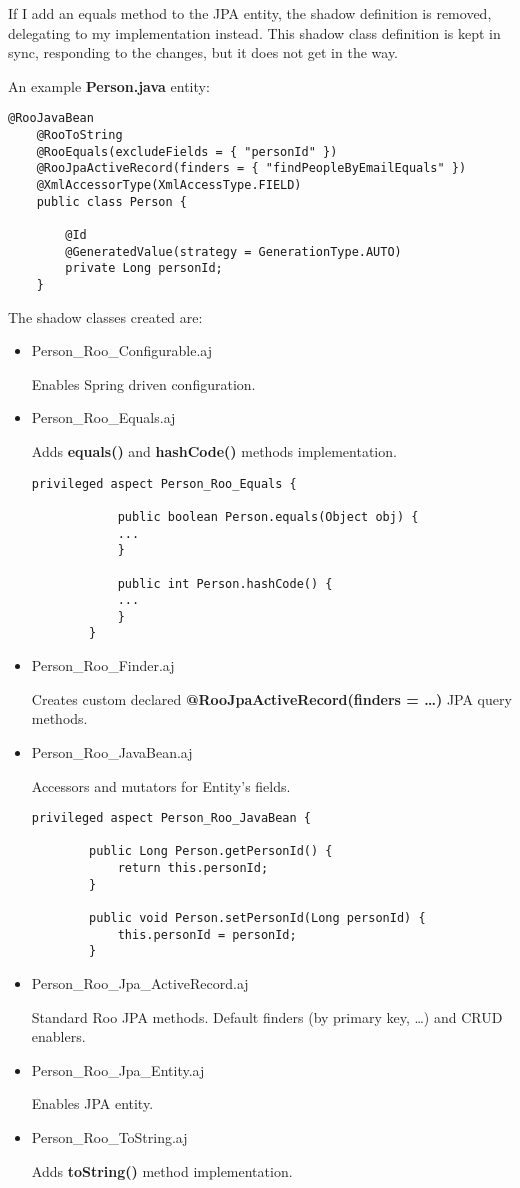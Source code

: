 	If I add an equals method to the JPA entity, the shadow definition is removed, delegating to my implementation instead.
	This shadow class definition is kept in sync, responding to the changes, but it does not get in the way.
	
	An example \textbf{Person.java} entity:
	
	\lstset{language=Java}
	\begin{lstlisting}[tabsize=2]
	@RooJavaBean
	@RooToString
	@RooEquals(excludeFields = { "personId" })
	@RooJpaActiveRecord(finders = { "findPeopleByEmailEquals" })
	@XmlAccessorType(XmlAccessType.FIELD)
	public class Person {

		@Id
		@GeneratedValue(strategy = GenerationType.AUTO)
		private Long personId;
	}
	\end{lstlisting}
	
	The shadow classes created are:
	\begin{itemize}
		\item Person\_Roo\_Configurable.aj
	  
	  	Enables Spring driven configuration. 
	  	\item Person\_Roo\_Equals.aj
	  
	  	Adds \textbf{equals()} and \textbf{hashCode()} methods implementation.
	  	
	  	\begin{lstlisting}[tabsize=2]
		privileged aspect Person_Roo_Equals {

			public boolean Person.equals(Object obj) {
			...
			}
	
			public int Person.hashCode() {
			...
			}
		}
		\end{lstlisting}
	  	\item Person\_Roo\_Finder.aj
	  
	  	Creates custom declared \textbf{@RooJpaActiveRecord(finders = { \ldots })} JPA query methods.
	  	\item Person\_Roo\_JavaBean.aj
	  
		Accessors and mutators for Entity's fields.
		\begin{lstlisting}[tabsize=2]
		privileged aspect Person_Roo_JavaBean {
	
		public Long Person.getPersonId() {
			return this.personId;
		}
	
		public void Person.setPersonId(Long personId) {
			this.personId = personId;
		}
		\end{lstlisting}
	  	\item Person\_Roo\_Jpa\_ActiveRecord.aj
	  	
	  	Standard Roo JPA methods. Default finders (by primary key, \ldots) and CRUD enablers.
	  	\item Person\_Roo\_Jpa\_Entity.aj
	  	
	  	Enables JPA entity.
	  	\item Person\_Roo\_ToString.aj
	  	
	  	Adds \textbf{toString()} method implementation. 
	\end{itemize}
	
